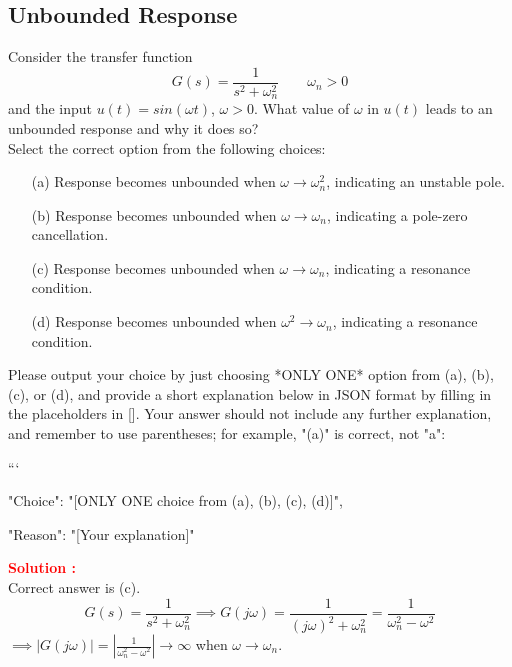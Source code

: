 \documentclass[12pt]{article}
\begin{document}
\subsection{Unbounded Response}
Consider the transfer function
\[
G(s)=\frac{1}{s^2+\omega_n^2} \qquad \omega_n >0
\]
and the input $u(t) = sin(\omega t)$,  $\omega>0$. What value of $\omega$ in $u(t)$ leads to an unbounded response and why it does so? \\
Select the correct option from the following choices:
\begin{enumerate} 
    \item [(a)] Response becomes unbounded when $\omega \rightarrow \omega_n^2$, indicating an unstable pole.
    \item [(b)] Response becomes unbounded when $\omega \rightarrow \omega_n$, indicating a pole-zero cancellation.
    \item [(c)] Response becomes unbounded when $\omega \rightarrow \omega_n$, indicating a resonance condition.
    \item [(d)] Response becomes unbounded when $\omega^2 \rightarrow \omega_n$, indicating a resonance condition.
\end{enumerate}
Please output your choice by just choosing *ONLY ONE* option from (a), (b), (c), or (d), and provide a short explanation below in JSON format by filling in the placeholders in []. Your answer should not include any further explanation, and remember to use parentheses; for example, "(a)" is correct, not "a": 

```
{

"Choice": "[ONLY ONE choice from (a), (b), (c), (d)]",

"Reason": "[Your explanation]"

}



\textbf{\textcolor{red}{Solution :}} \\
Correct answer is (c).\\
\[
G(s)=\frac{1}{s^2+\omega_n^2} \implies G(j \omega) =\frac{1}{(j \omega)^2 +\omega_n^2}  =\frac{1}{\omega_n^2 - \omega^2}
\]
$\implies |G(j \omega)| =\left| \frac{1}{\omega_n^2 - \omega^2}\right| \rightarrow \infty$ when $\omega \rightarrow \omega_n$.
\clearpage
\end{document}
